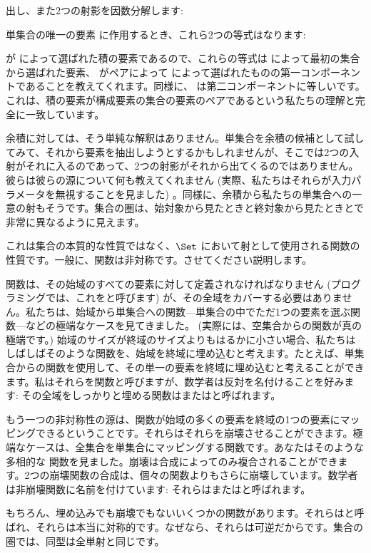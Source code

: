 出し、また2つの射影を因数分解します: 

単集合の唯一の要素 \code{()} に作用するとき、これら2つの等式はなります: 

 が  によって選ばれた積の要素であるので、これらの等式は  によって最初の集合から選ばれた要素、 がペアによって  によって選ばれたものの第一コンポーネントであることを教えてくれます。同様に、 は第二コンポーネントに等しいです。これは、積の要素が構成要素の集合の要素のペアであるという私たちの理解と完全に一致しています。

余積に対しては、そう単純な解釈はありません。単集合を余積の候補として試してみて、それから要素を抽出しようとするかもしれませんが、そこでは2つの入射がそれに入るのであって、2つの射影がそれから出てくるのではありません。彼らは彼らの源について何も教えてくれません (実際、私たちはそれらが入力パラメータを無視することを見ました) 。同様に、余積から私たちの単集合への一意の射もそうです。集合の圏は、始対象から見たときと終対象から見たときとで非常に異なるように見えます。

これは集合の本質的な性質ではなく、$\Set$ において射として使用される関数の性質です。一般に、関数は非対称です。させてください説明します。

関数は、その始域のすべての要素に対して定義されなければなりません (プログラミングでは、これをと呼びます) が、その全域をカバーする必要はありません。私たちは、始域から単集合への関数---単集合の中でただ1つの要素を選ぶ関数---などの極端なケースを見てきました。 (実際には、空集合からの関数が真の極端です。) 始域のサイズが終域のサイズよりもはるかに小さい場合、私たちはしばしばそのような関数を、始域を終域に埋め込むと考えます。たとえば、単集合からの関数を使用して、その単一の要素を終域に埋め込むと考えることができます。私はそれらを関数と呼びますが、数学者は反対を名付けることを好みます: その全域をしっかりと埋める関数はまたはと呼ばれます。

もう一つの非対称性の源は、関数が始域の多くの要素を終域の1つの要素にマッピングできるということです。それらはそれらを崩壊させることができます。極端なケースは、全集合を単集合にマッピングする関数です。あなたはそのような多相的な  関数を見ました。崩壊は合成によってのみ複合されることができます。2つの崩壊関数の合成は、個々の関数よりもさらに崩壊しています。数学者は非崩壊関数に名前を付けています: それらはまたはと呼ばれます。

もちろん、埋め込みでも崩壊でもないいくつかの関数があります。それらはと呼ばれ、それらは本当に対称的です。なぜなら、それらは可逆だからです。集合の圏では、同型は全単射と同じです。

